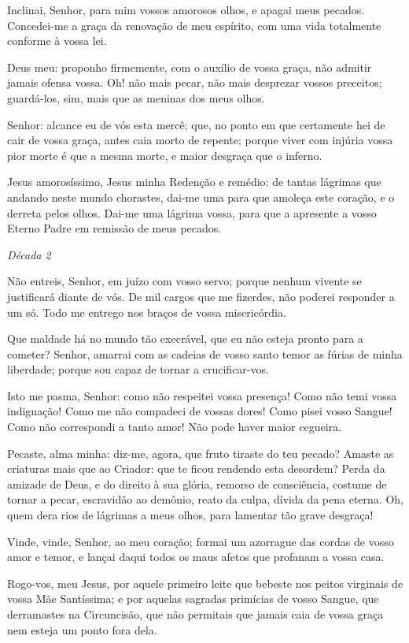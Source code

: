 Inclinai, Senhor, para mim vossos amorosos olhos, e apagai meus pecados. Concedei-me a graça da renovação de meu espírito, com uma vida totalmente conforme à vossa lei.

Deus meu: proponho firmemente, com o auxílio de vossa graça, não admitir jamais ofensa vossa. Oh! não mais pecar, não mais desprezar vossos preceitos; guardá-los, sim, mais que as meninas dos meus olhos.

Senhor: alcance eu de vós esta mercê; que, no ponto em que certamente hei de cair de vossa graça, antes caia morto de repente; porque viver com injúria vossa pior morte é que a mesma morte, e maior desgraça que o inferno.

Jesus amorosíssimo, Jesus minha Redenção e remédio: de tantas lágrimas que andando neste mundo chorastes, dai-me uma para que amoleça este coração, e o derreta pelos olhos. Dai-me uma lágrima vossa, para que a apresente a vosso Eterno Padre em remissão de meus pecados.

\begin{nscenter} \emph{Década 2} \end{nscenter}

Não entreis, Senhor, em juízo com vosso servo; porque nenhum vivente se justificará diante de vós. De mil cargos que me fizerdes, não poderei responder a um só. Todo me entrego nos braços de vossa misericórdia.

Que maldade há no mundo tão execrável, que eu não esteja pronto para a cometer? Senhor, amarrai com as cadeias de vosso santo temor as fúrias de minha liberdade; porque sou capaz de tornar a crucificar-vos.

Isto me pasma, Senhor: como não respeitei vossa presença! Como não temi vossa indignação! Como me não compadeci de vossas dores! Como pisei vosso Sangue! Como não correspondi a tanto amor! Não pode haver maior cegueira.

Pecaste, alma minha: diz-me, agora, que fruto tiraste do teu pecado? Amaste as criaturas mais que ao Criador: que te ficou rendendo esta desordem? Perda da amizade de Deus, e do direito à sua glória, remorso de consciência, costume de tornar a pecar, escravidão ao demônio, reato da culpa, dívida da pena eterna. Oh, quem dera rios de lágrimas a meus olhos, para lamentar tão grave desgraça!

Vinde, vinde, Senhor, ao meu coração; formai um azorrague das cordas de vosso amor e temor, e lançai daqui todos os maus afetos que profanam a vossa casa.

Rogo-vos, meu Jesus, por aquele primeiro leite que bebeste nos peitos virginais de vossa Mãe Santíssima; e por aquelas sagradas primícias de vosso Sangue, que derramastes na Circuncisão, que não permitais que jamais caia de vossa graça nem esteja um ponto fora dela.

